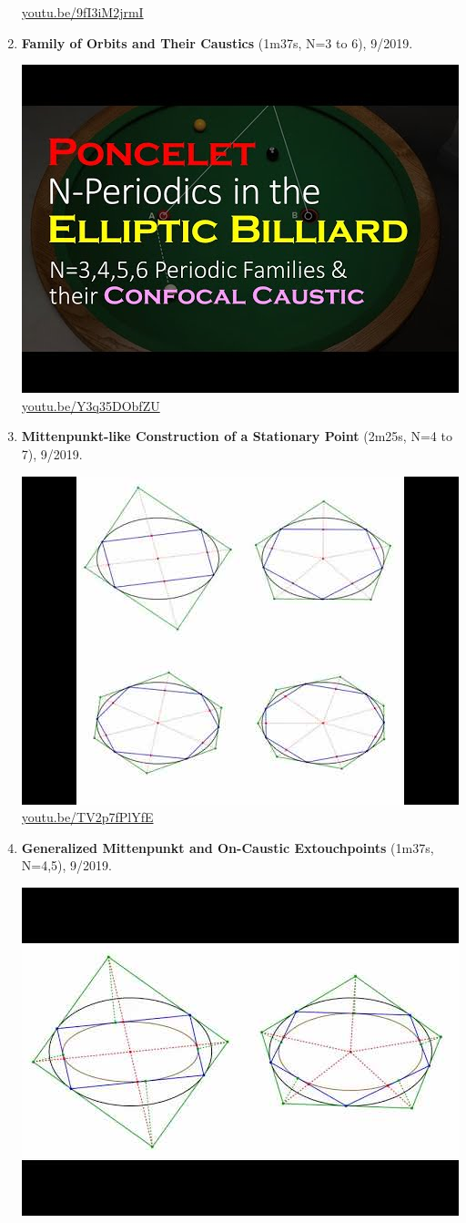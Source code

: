 \documentclass[12pt]{amsart}
\begin{document}
\begin{enumerate}[resume]
\begin{center}
\href{https://youtu.be/9fI3iM2jrmI}{\url{youtu.be/9fI3iM2jrmI}}\end{center}
% 
\item \textbf{Family of Orbits and Their Caustics} (1m37s, N=3 to 6), 9/2019. 
\begin{center}\includegraphics[width=.5\textwidth]{pics/Y3q35DObfZU.jpg} \\ 
\href{https://youtu.be/Y3q35DObfZU}{\url{youtu.be/Y3q35DObfZU}}\end{center}
% 
\item \textbf{Mittenpunkt-like Construction of a Stationary Point} (2m25s, N=4 to 7), 9/2019. 
\begin{center}\includegraphics[width=.5\textwidth]{pics/TV2p7fPlYfE.jpg} \\ 
\href{https://youtu.be/TV2p7fPlYfE}{\url{youtu.be/TV2p7fPlYfE}}\end{center}
% 
\item \textbf{Generalized Mittenpunkt and On-Caustic Extouchpoints} (1m37s, N=4,5), 9/2019. 
\begin{center}\includegraphics[width=.5\textwidth]{pics/Bpc-MrR2IMc.jpg} \\ 

\end{center}
\end{enumerate}
\end{document}
